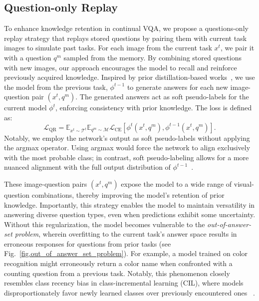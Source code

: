 \subsection{Question-only Replay}%
To enhance knowledge retention in continual VQA, we propose a questions-only replay strategy that replays stored questions by pairing them with current task images to simulate past tasks. For each image from the current task $x^{t}$, we pair it with a question $q^{m}$ sampled from the memory. By combining stored questions with new images, our approach encourages the model to recall and reinforce previously acquired knowledge. Inspired by prior distillation-based works~\citep{li2017lwf, dhar2019learning}, we use the model from the previous task, $\phi^{t-1}$ to generate answers for each new image-question pair $(x^t, q^m)$. The generated answers act as soft pseudo-labels for the current model $\phi^{t}$, enforcing consistency with prior knowledge. The loss is defined as:
\begin{equation}
    \label{eq.trad_feat}
    \mathcal{L}_{\text{QR}} = \mathbb{E}_{x^t\sim \mathcal{T}^t}\mathbb{E}_{q^m\sim \mathcal{M}}\mathcal{L}_{\text{CE}}\left[\phi^{t}(x^t,q^m),\phi^{t-1}(x^t,q^m)\right].
\end{equation}
Notably, we employ the network’s output as soft pseudo-labels without applying the argmax operator. Using argmax would force the network to align exclusively with the most probable class; in contrast, soft pseudo-labeling allows for a more nuanced alignment with the full output distribution of $\phi^{t-1}$~\citep{hinton2015distilling, zhang2021refining, learning-soft-labels}.

These image-question pairs $(x^t,q^m)$ expose the model to a wide range of visual-question combinations, thereby improving the model’s retention of prior knowledge. Importantly, this strategy enables the model to maintain versatility in answering diverse question types, even when predictions exhibit some uncertainty. Without this regularization, the model becomes vulnerable to the \textit{out-of-answer-set problem}, wherein overfitting to the current task’s answer space results in erroneous responses for questions from prior tasks (see Fig.~\ref{fig.out_of_answer_set_problem}). For example, a model trained on color recognition might erroneously return a color name when confronted with a counting question from a previous task. Notably, this phenomenon closely resembles class recency bias in class-incremental learning (CIL), where models disproportionately favor newly learned classes over previously encountered ones ~\citep{rypesc2025task, mai2021supervised}.

